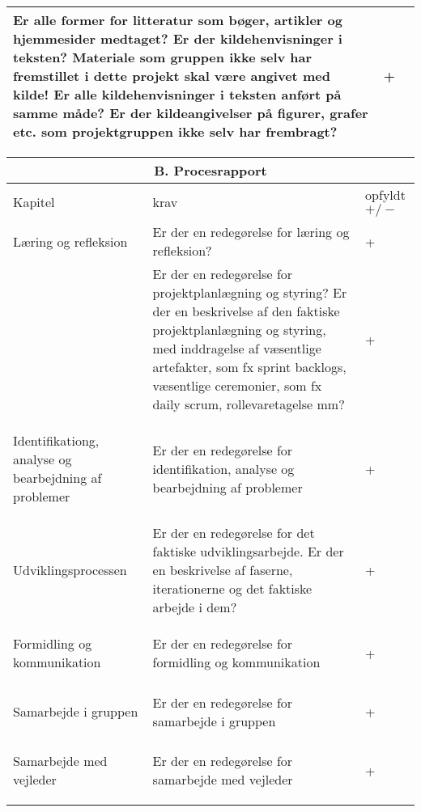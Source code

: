 \begin{center}
\begin{longtable}{|m{3.5cm}|m{10cm}|m{2.5cm}|}
Er alle former for litteratur som bøger, artikler og hjemmesider medtaget? \newline
Er der kildehenvisninger i teksten? Materiale som gruppen ikke selv har fremstillet i dette projekt skal være angivet med kilde! \newline
Er alle kildehenvisninger i teksten anført på samme måde? \newline
Er der kildeangivelser på figurer, grafer etc. som projektgruppen ikke selv har frembragt? & +\\
\hline
\end{longtable}
\end{center}

\newpage
\begin{center}
\begin{longtable}{|m{3.5cm}|m{10cm}|m{2.5cm}|}
\hline
\multicolumn{3}{|c|}{B. Procesrapport} \\
\hline
Kapitel & krav & opfyldt $+/-$ \\ \hline
Læring og refleksion & Er der en redegørelse for læring og refleksion? & +\\ 
\hline
& Er der en redegørelse for projektplanlægning og styring? Er der en beskrivelse af den faktiske projektplanlægning og styring, med inddragelse af væsentlige artefakter, som fx sprint backlogs, væsentlige ceremonier, som fx  daily scrum, rollevaretagelse mm? & +\\ 
\hline
\begin{flushleft} 
Identifikationg, analyse og bearbejdning af problemer
\end{flushleft}
& Er der en redegørelse for identifikation, analyse og bearbejdning af problemer & +\\ 
\hline
Udviklingsprocessen & Er der en redegørelse for det faktiske udviklingsarbejde. Er der en beskrivelse af faserne, iterationerne og det faktiske  arbejde i dem? & +\\ \hline
\begin{flushleft} 
Formidling og kommunikation
\end{flushleft}
& Er der en redegørelse for formidling og kommunikation & +\\ 
\hline
\begin{flushleft} 
Samarbejde i gruppen 
\end{flushleft}
& Er der en redegørelse for samarbejde i gruppen & +\\ \hline
\begin{flushleft} 
Samarbejde med vejleder
\end{flushleft}
& Er der en redegørelse for samarbejde med vejleder & +\\ \hline

\end{longtable}
\end{center}
